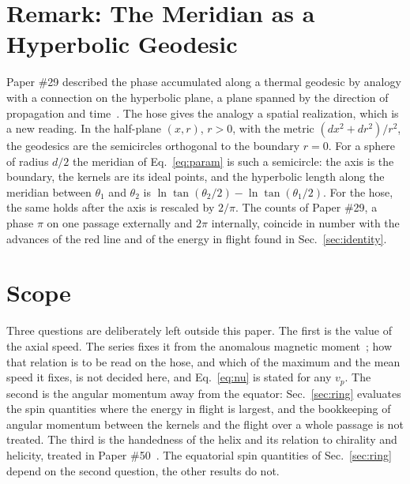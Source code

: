 \documentclass[%
 reprint, amsmath,amssymb, aps, prb, ]{revtex4-2}
\numberwithin{equation}{section}
\begin{document}
\section{Remark: The Meridian as a Hyperbolic Geodesic}
\label{sec:hyp}

Paper \#29 described the phase accumulated along a thermal geodesic by analogy with a connection on the hyperbolic plane, a plane spanned by the direction of propagation and time~\cite{H29}. The hose gives the analogy a spatial realization, which is a new reading. In the half-plane $(x, r)$, $r > 0$, with the metric $(dx^2 + dr^2)/r^2$, the geodesics are the semicircles orthogonal to the boundary $r = 0$. For a sphere of radius $d/2$ the meridian of Eq.~\eqref{eq:param} is such a semicircle: the axis is the boundary, the kernels are its ideal points, and the hyperbolic length along the meridian between $\theta_1$ and $\theta_2$ is $\ln\tan(\theta_2/2) - \ln\tan(\theta_1/2)$. For the hose, the same holds after the axis is rescaled by $2/\pi$. The counts of Paper \#29, a phase $\pi$ on one passage externally and $2\pi$ internally, coincide in number with the advances of the red line and of the energy in flight found in Sec.~\ref{sec:identity}.

\section{Scope}
\label{sec:scope}

Three questions are deliberately left outside this paper. The first is the value of the axial speed. The series fixes it from the anomalous magnetic moment~\cite{H10,H66}; how that relation is to be read on the hose, and which of the maximum and the mean speed it fixes, is not decided here, and Eq.~\eqref{eq:nu} is stated for any $v_p$. The second is the angular momentum away from the equator: Sec.~\ref{sec:ring} evaluates the spin quantities where the energy in flight is largest, and the bookkeeping of angular momentum between the kernels and the flight over a whole passage is not treated. The third is the handedness of the helix and its relation to chirality and helicity, treated in Paper \#50~\cite{H50}. The equatorial spin quantities of Sec.~\ref{sec:ring} depend on the second question, the other results do not.
\end{document}
